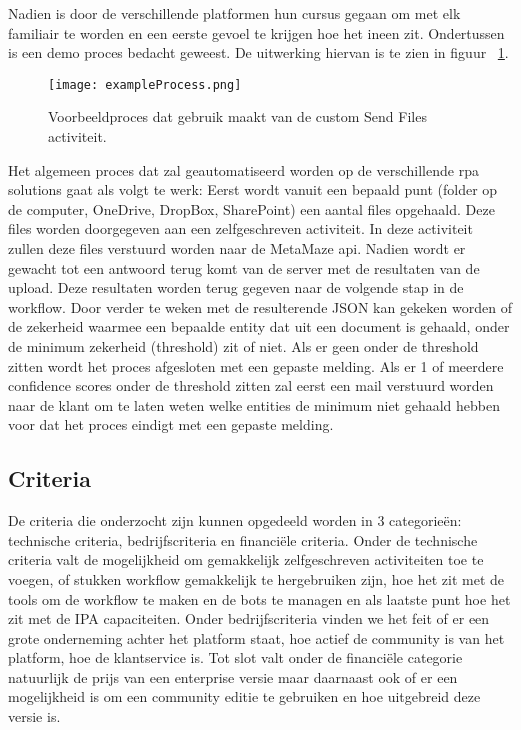 Nadien is door de verschillende platformen hun cursus gegaan om met elk familiair te worden en een eerste gevoel te krijgen hoe het ineen zit. Ondertussen is een demo proces bedacht geweest. De uitwerking hiervan is te zien in figuur ~\ref{fig:exampleProcess}.

\begin{figure}[h]
	\texttt{[image: exampleProcess.png]}
	\caption[Te automatiseren demoproces]{Voorbeeldproces dat gebruik maakt van de custom Send Files activiteit.}
	\label{fig:exampleProcess}
\end{figure}

Het algemeen proces dat zal geautomatiseerd worden op de verschillende \acrshort{rpa} solutions gaat als volgt te werk: Eerst wordt vanuit een bepaald punt (folder op de computer, OneDrive, DropBox, SharePoint) een aantal files opgehaald. Deze files worden doorgegeven aan een zelfgeschreven activiteit. In deze activiteit zullen deze files verstuurd worden naar de MetaMaze \acrshort{api}. Nadien wordt er gewacht tot een antwoord terug komt van de server met de resultaten van de upload. Deze resultaten worden terug gegeven naar de volgende stap in de workflow. Door verder te weken met de resulterende JSON kan gekeken worden of de zekerheid waarmee een bepaalde entity dat uit een document is gehaald, onder de minimum zekerheid (threshold) zit of niet. Als er geen onder de threshold zitten wordt het proces afgesloten met een gepaste melding. Als er 1 of meerdere confidence scores onder de threshold zitten zal eerst een mail verstuurd worden naar de klant om te laten weten welke entities de minimum niet gehaald hebben voor dat het proces eindigt met een gepaste melding.

\subsection{Criteria}
De criteria die onderzocht zijn kunnen opgedeeld worden in 3 categorieën: technische criteria, bedrijfscriteria en financiële criteria. Onder de technische criteria valt de mogelijkheid om gemakkelijk zelfgeschreven activiteiten toe te voegen, of stukken workflow gemakkelijk te hergebruiken zijn, hoe het zit met de tools om de workflow te maken en de bots te managen en als laatste punt hoe het zit met de IPA capaciteiten. Onder bedrijfscriteria vinden we het feit of er een grote onderneming achter het platform staat, hoe actief de community is van het platform, hoe de klantservice is. Tot slot valt onder de financiële categorie natuurlijk de prijs van een enterprise versie maar daarnaast ook of er een mogelijkheid is om een community editie te gebruiken en hoe uitgebreid deze versie is.


